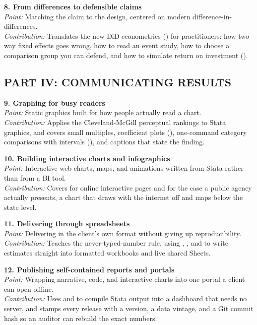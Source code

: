 \documentclass[11pt]{article}
\begin{document}
\textbf{8. From differences to defensible claims}\\
\textit{Point:} Matching the claim to the design, centered on modern difference-in-differences.\\
\textit{Contribution:} Translates the new DiD econometrics () for practitioners: how two-way fixed effects goes wrong, how to read an event study, how to choose a comparison group you can defend, and how to simulate return on investment ().

\subsection*{PART IV: COMMUNICATING RESULTS}
\textbf{9. Graphing for busy readers}\\
\textit{Point:} Static graphics built for how people actually read a chart.\\
\textit{Contribution:} Applies the Cleveland-McGill perceptual rankings to Stata graphics, and covers small multiples, coefficient plots (), one-command category comparisons with intervals (), and captions that state the finding.

\textbf{10. Building interactive charts and infographics}\\
\textit{Point:} Interactive web charts, maps, and animations written from Stata rather than from a BI tool.\\
\textit{Contribution:} Covers  for online interactive pages and  for the case a public agency actually presents, a chart that draws with the internet off and maps below the state level.

\textbf{11. Delivering through spreadsheets}\\
\textit{Point:} Delivering in the client's own format without giving up reproducibility.\\
\textit{Contribution:} Teaches the never-typed-number rule, using , , and  to write estimates straight into formatted workbooks and live shared Sheets.

\textbf{12. Publishing self-contained reports and portals}\\
\textit{Point:} Wrapping narrative, code, and interactive charts into one portal a client can open offline.\\
\textit{Contribution:} Uses  and  to compile Stata output into a dashboard that needs no server, and stamps every release with a version, a data vintage, and a Git commit hash so an auditor can rebuild the exact numbers.
\end{document}
